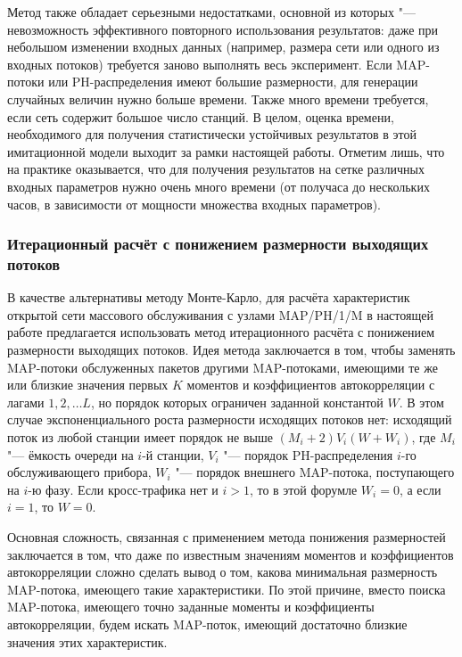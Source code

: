 Метод также обладает серьезными недостатками, основной из которых "--- невозможность эффективного повторного использования результатов: даже при небольшом изменении входных данных (например, размера сети или одного из входных потоков) требуется заново выполнять весь эксперимент. Если MAP-потоки или PH-распределения имеют большие размерности, для генерации случайных величин нужно больше времени. Также много времени требуется, если сеть содержит большое число станций. В целом, оценка времени, необходимого для получения статистически устойчивых результатов в этой имитационной модели выходит за рамки настоящей работы. Отметим лишь, что на практике оказывается, что для получения результатов на сетке различных входных параметров нужно очень много времени (от получаса до нескольких часов, в зависимости от мощности множества входных параметров).


\subsubsection{Итерационный расчёт с понижением размерности выходящих потоков}

В качестве альтернативы методу Монте-Карло, для расчёта характеристик открытой сети массового обслуживания с узлами MAP/PH/1/M в настоящей работе предлагается использовать метод итерационного расчёта с понижением размерности выходящих потоков. Идея метода заключается в том, чтобы заменять MAP-потоки обслуженных пакетов другими MAP-потоками, имеющими те же или близкие значения первых $K$ моментов и коэффициентов автокорреляции с лагами $1, 2, \dots L$, но порядок которых ограничен заданной константой $W$. В этом случае экспоненциального роста размерности исходящих потоков нет: исходящий поток из любой станции имеет порядок не выше $(M_i + 2) V_i (W + W_i)$, где $M_i$ "--- ёмкость очереди на $i$-й станции, $V_i$ "--- порядок PH-распределения $i$-го обслуживающего прибора, $W_i$ "--- порядок внешнего MAP-потока, поступающего на $i$-ю фазу. Если кросс-трафика нет и $i > 1$, то в этой форумле $W_i = 0$, а если $i = 1$, то $W = 0$.

Основная сложность, связанная с применением метода понижения размерностей заключается в том, что даже по известным значениям моментов и коэффициентов автокорреляции сложно сделать вывод о том, какова минимальная размерность MAP-потока, имеющего такие характеристики. По этой причине, вместо поиска MAP-потока, имеющего точно заданные моменты и коэффициенты автокорреляции, будем искать MAP-поток, имеющий достаточно близкие значения этих характеристик.

